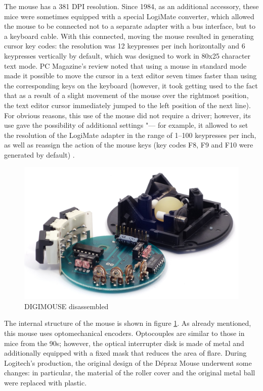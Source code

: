 \documentclass[11pt, a4paper]{article}
\begin{document}
The mouse has a 381 DPI resolution. Since 1984, as an additional accessory, these mice were sometimes equipped with a special LogiMate \cite{oldmouse} converter, which allowed the mouse to be connected not to a separate adapter with a bus interface, but to a keyboard cable. With this connected, moving the mouse resulted in generating cursor key codes:  the resolution was 12 keypresses per inch horizontally and 6 keypresses vertically by default, which was designed to work in 80x25 character text mode. PC Magazine's review noted that using a mouse in standard mode made it possible to move the cursor in a text editor seven times faster than using the corresponding keys on the keyboard (however, it took getting used to the fact that as a result of a slight movement of the mouse over the rightmost position, the text editor cursor immediately jumped to the left position of the next line). For obvious reasons, this use of the mouse did not require a driver; however, its use gave the possibility of additional settings "--- for example, it allowed to set the resolution of the LogiMate adapter in the range of 1--100 keypresses per inch, as well as reassign the action of the mouse keys (key codes F8, F9 and F10 were generated by default) \cite{DIGIMOUSE}.

 \begin{figure}[h]
    \centering
    \includegraphics[scale=0.75]{1982_depraz_digimouse/inside_60.jpg}
    \caption{DIGIMOUSE disassembled}
    \label{fig:DIGIMOUSEP4Inside}
\end{figure}

The internal structure of the mouse is shown in figure \ref{fig:DIGIMOUSEP4Inside}. As already mentioned, this mouse uses optomechanical encoders. Optocouples are similar to those in mice from the 90s; however, the optical interrupter disk is made of metal and additionally equipped with a fixed mask that reduces the area of flare. During Logitech's production, the original design of the D\'epraz Mouse underwent some changes: in particular, the material of the roller cover and the original metal ball \cite{oldmouse} were replaced with plastic.
\end{document}
